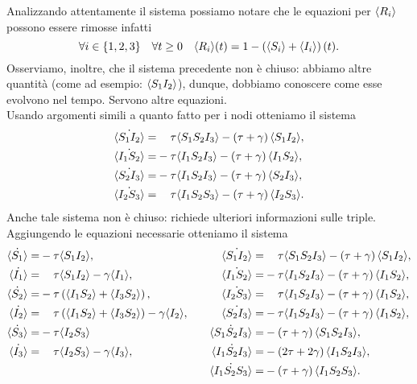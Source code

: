 Analizzando attentamente il sistema possiamo notare che le equazioni per $\langle R_i \rangle$ possono essere rimosse infatti 
$$ \forall i\in\{1, 2, 3\} \quad \forall t\geq 0 \quad \langle R_i \rangle(t) = 1 - \left( \langle S_i \rangle +\langle I_i \rangle \right)(t).$$
Osserviamo, inoltre, che il sistema precedente non \`e chiuso: abbiamo altre quantit\`a  (come ad esempio: $\langle S_1I_2 \rangle$), dunque, dobbiamo conoscere come esse evolvono nel tempo. Servono altre equazioni.\\
Usando argomenti simili a quanto fatto per i nodi otteniamo  il sistema 
\begin{equation*}
\begin{aligned}
	\dot{\angol{S_1I_2}}=&\spa\tau\angol{S_1S_2I_3} - \tonde{ \tau + \gamma}\angol{S_1 I_2},
\\
	\dot{\angol{I_1S_2}}=&-\tau\angol{I_1S_2I_3} - \tonde{ \tau + \gamma}\angol{I_1 S_2},
\\
	\dot{\angol{S_2I_3}}=&-\tau\angol{I_1S_2I_3} - \tonde{ \tau + \gamma}\angol{S_2 I_3},
\\
	\dot{\angol{I_2S_3}}=&\spa\tau\angol{I_1S_2S_3} - \tonde{ \tau + \gamma}\angol{I_2 S_3}.
	\end{aligned}
\end{equation*}
Anche tale sistema non \`e chiuso: richiede  ulteriori informazioni sulle triple.\\
Aggiungendo le equazioni necessarie otteniamo il sistema 
\begin{equation}
\label{3nodi}
\begin{aligned}
	\dot{\angol {S_1}} =& -\tau \angol{ S_1 I_2},
& \quad 
	\dot{\angol{S_1I_2}}=& \spa\tau\angol{S_1S_2I_3} - \tonde{ \tau + \gamma}\angol{S_1 I_2},
\\ 
	\dot{\angol {I_1}} =&\spa \tau \angol{ S_1 I_2}-\gamma \angol{I_1}, 
& \quad 
	\dot{\angol{I_1S_2}}=&-\tau\angol{I_1S_2I_3} - \tonde{ \tau + \gamma}\angol{I_1 S_2},
\\ 
	\dot{\angol {S_2}} = & -\tau \tonde{ \angol{ I_1 S_2}+ \angol{I_3S_2}},
& \quad 
	\dot{\angol{I_2S_3}}=&\spa\tau\angol{I_1S_2I_3} - \tonde{ \tau + \gamma}\angol{I_1 S_2},
\\
	\dot{\angol {I_2}} = &\spa \tau \tonde{ \angol{ I_1 S_2} + \angol{I_3S_2}}-\gamma \angol{I_2}, 
& \quad 
	\dot{\angol{S_2I_3}}=&-\tau\angol{I_1S_2I_3} - \tonde{ \tau + \gamma}\angol{I_1 S_2},
\\ 
	\dot{\angol {S_3}} = & -\tau \angol{ I_2 S_3}
&\quad  
	\dot{\angol{S_1S_2I_3}}=&-\tonde{\tau + \gamma}\angol{S_1S_2I_3},
\\
	\dot{\angol {I_3}} = & \spa \tau  \angol{ I_2 S_3}-\gamma \angol{I_3},	
& \quad 
	\dot{\angol{I_1S_2I_3}}=&-\tonde{2\tau + 2\gamma}\angol{I_1S_2I_3},
\\
	&
&\quad  
	\dot{\angol{I_1S_2S_3}}=&-\tonde{\tau + \gamma}\angol{I_1S_2S_3}.
 \end{aligned}
\end{equation}
